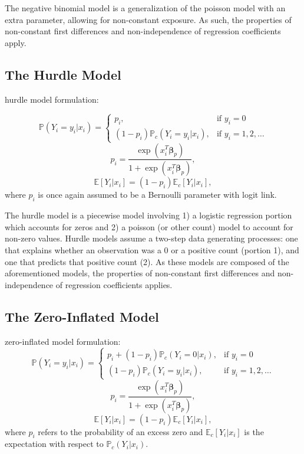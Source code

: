 \documentclass[jou, apacite]{apa6}
\begin{document}
The negative binomial model is a generalization of the poisson model with an extra parameter, allowing for non-constant exposure. As such, the properties of non-constant first differences and non-independence of regression coefficients apply. 


\subsection{The Hurdle Model}

hurdle model formulation:

\begin{equation}
\mathbb{P}(Y_i = y_i|x_i) =
  \begin{cases}
    p_i, & \text{if } y_i = 0 \\
    (1 - p_i)\mathbb{P}_c(Y_i = y_i|x_i), & \text{if } y_i = 1, 2, \dots
  \end{cases}
\end{equation}
\begin{equation}
p_i = \dfrac{\exp (x_i^T \bm{\beta}_{p})}{1 + \exp (x_i^T \bm{\beta}_{p})},
\end{equation}
\begin{equation}
\mathbb{E}[Y_i|x_i] = (1 - p_i)\mathbb{E}_c[Y_i|x_i], %
\end{equation}
where $p_i$ is once again assumed to be a Bernoulli parameter with logit link.

The hurdle model is a piecewise model involving 1) a logistic regression portion which accounts for zeros and 2) a poisson (or other count) model to account for non-zero values. Hurdle models assume a two-step data generating processes: one that explains whether an observation was a 0 or a positive count (portion 1), and one that predicts that positive count (2). As these models are composed of the aforementioned models, the properties of non-constant first differences and non-independence of regression coefficients applies. 

\subsection{The Zero-Inflated Model}

zero-inflated model formulation:
\begin{equation}
\mathbb{P}(Y_i = y_i|x_i) =
  \begin{cases}
    p_i + (1 - p_i)\mathbb{P}_c(Y_i = 0|x_i), & \text{if } y_i = 0 \\
    (1 - p_i) \mathbb{P}_c(Y_i = y_i|x_i), & \text{if } y_i = 1, 2, \dots
  \end{cases}
\end{equation}
\begin{equation}
 p_i = \dfrac{\exp (x_i^T \bm{\beta}_{p})}{1 + \exp (x_i^T \bm{\beta}_{p})},
\end{equation}
\begin{equation}
\mathbb{E}[Y_i|x_i] = (1 - p_i)\mathbb{E}_c[Y_i|x_i], %
\end{equation}
where $p_i$ refers to the probability of an excess zero and $\mathbb{E}_c[Y_i|x_i]$ is the expectation with respect to $\mathbb{P}_c(Y_i|x_i)$.
\end{document}
